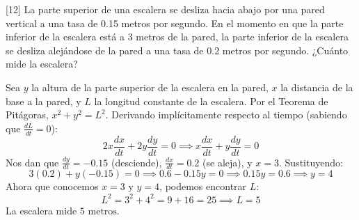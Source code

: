\documentclass[11pt,paper=a4,answers, addpoints]{exam}
\begin{document}
\begin{questions}
[12\half]
La parte superior de una escalera se desliza hacia abajo por una pared vertical a una tasa de 0.15 metros por segundo. En el momento en que la parte inferior de la escalera está a 3 metros de la pared, la parte inferior de la escalera se desliza alejándose de la pared a una tasa de 0.2 metros por segundo. ¿Cuánto mide la escalera?
\begin{solution}
Sea $y$ la altura de la parte superior de la escalera en la pared, $x$ la distancia de la base a la pared, y $L$ la longitud constante de la escalera.
Por el Teorema de Pitágoras, $x^2 + y^2 = L^2$.
Derivando implícitamente respecto al tiempo (sabiendo que $\frac{dL}{dt} = 0$):
\[ 2x \frac{dx}{dt} + 2y \frac{dy}{dt} = 0 \implies x \frac{dx}{dt} + y \frac{dy}{dt} = 0 \]
Nos dan que $\frac{dy}{dt} = -0.15$ (desciende), $\frac{dx}{dt} = 0.2$ (se aleja), y $x = 3$. Sustituyendo:
\[ 3(0.2) + y(-0.15) = 0 \implies 0.6 - 0.15y = 0 \implies 0.15y = 0.6 \implies y = 4 \]
Ahora que conocemos $x = 3$ y $y = 4$, podemos encontrar $L$:
\[ L^2 = 3^2 + 4^2 = 9 + 16 = 25 \implies L = 5 \]
La escalera mide $5 \text{ metros}$.
\end{solution}
\end{questions}
\end{document}
